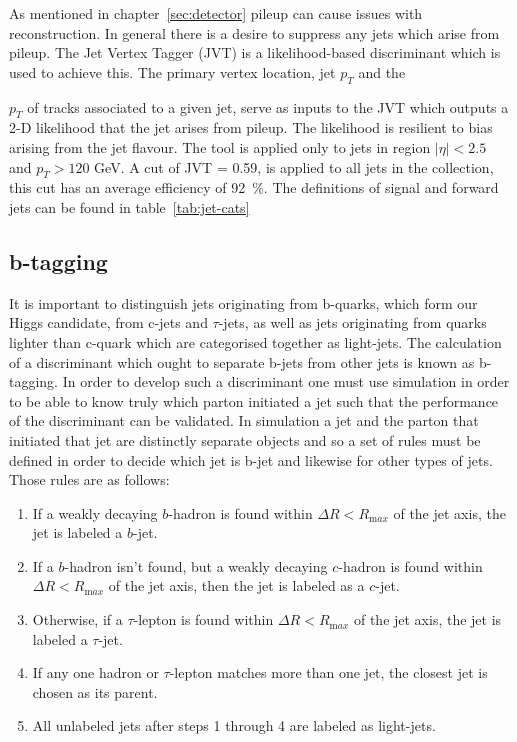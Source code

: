 As mentioned in chapter~\ref{sec:detector} pileup can cause issues with
reconstruction. In general there is a desire to suppress any jets which arise
from pileup. The Jet Vertex Tagger (JVT) is a likelihood-based discriminant
which is used to achieve this. The primary vertex location, jet $p_T$ and the

$p_T$ of tracks associated to a given jet, serve as inputs to the JVT which
outputs a 2-D likelihood that the jet arises from pileup. The likelihood is
resilient to bias arising from the jet flavour. The tool is applied only to jets
in region $\lvert  \eta \rvert < 2.5$ and $p_T > 120$ GeV. A cut of JVT = 0.59,
is applied to all jets in the collection, this cut has an average efficiency of
92~\%. The definitions of signal and forward jets can be found in table~\ref{tab:jet-cats}


\subsection{b-tagging}

It is important to distinguish jets originating from b-quarks, which form our
Higgs candidate, from c-jets and $\tau$-jets, as well as jets originating from
quarks lighter than c-quark which are categorised together as light-jets. The
calculation of a discriminant which ought to separate b-jets from other jets is
known as b-tagging. In order to develop such a discriminant one must use
simulation in order to be able to know truly which parton initiated a jet such
that the performance of the discriminant can be validated. In simulation a jet
and the parton that initiated that jet are distinctly separate objects and so a
set of rules must be defined in order to decide which jet is b-jet and likewise
for other types of jets. Those rules are as follows:
\begin{enumerate}
\item  If a weakly decaying $b$-hadron is found within $\Delta R<R_{\mathrm max}$ of the
  jet axis, the jet is labeled a $b$-jet.
\item  If a $b$-hadron isn't found, but a weakly decaying $c$-hadron is
  found within $\Delta R<R_{\mathrm max}$ of the jet axis, then the jet is labeled as a $c$-jet.
\item  Otherwise, if a $\tau$-lepton is found within
  $\Delta R<R_{\mathrm max}$ of the jet axis, the jet is labeled a $\tau$-jet.
\item If any one hadron or $\tau$-lepton matches more than one jet, the closest jet
  is chosen as its parent.
\item All unlabeled jets after steps 1 through 4 are labeled as light-jets.
\end{enumerate}

